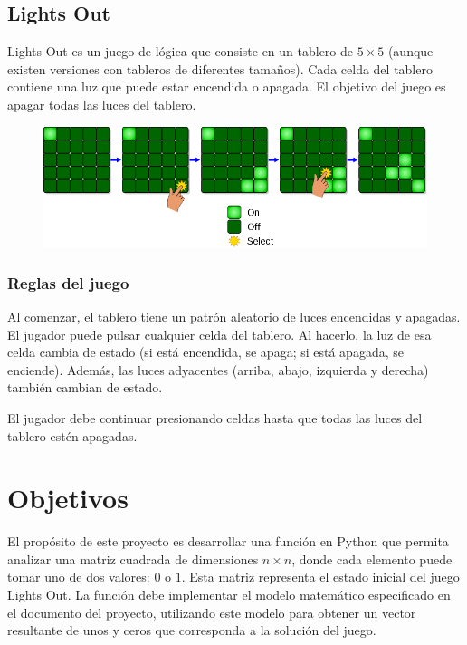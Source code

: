 \documentclass{article}
\begin{document}
    \subsection{Lights Out}
    Lights Out es un juego de lógica que consiste en un tablero de \(5 \times 5\) (aunque existen versiones con tableros de diferentes tamaños). Cada celda del tablero contiene una luz que puede estar encendida o apagada. El objetivo del juego es apagar todas las luces del tablero.

    \begin{figure}[h]
        \centering
        \includegraphics[scale=0.4]{lightsout.png}
    \end{figure}


    \subsubsection*{Reglas del juego}
    Al comenzar, el tablero tiene un patrón aleatorio de luces encendidas y apagadas. El jugador puede pulsar cualquier celda del tablero. Al hacerlo, la luz de esa celda cambia de estado (si está encendida, se apaga; si está apagada, se enciende). Además, las luces adyacentes (arriba, abajo, izquierda y derecha) también cambian de estado.

    El jugador debe continuar presionando celdas hasta que todas las luces del tablero estén apagadas.

    \newpage

    \section{Objetivos}
    El propósito de este proyecto es desarrollar una función en Python que permita analizar una matriz cuadrada de dimensiones \(n \times n\), donde cada elemento puede tomar uno de dos valores: \(0\) o \(1\). Esta matriz representa el estado inicial del juego Lights Out. La función debe implementar el modelo matemático especificado en el documento del proyecto, utilizando este modelo para obtener un vector resultante de unos y ceros que corresponda a la solución del juego.
    
\end{document}
